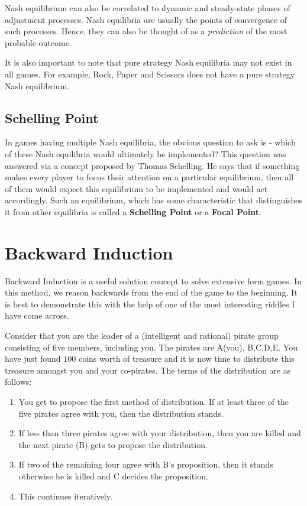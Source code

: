 \documentclass{article}
\theoremstyle{definition}
\begin{document}
Nash equilibrium can also be correlated to dynamic and steady-state phases of adjustment processes. Nash equilibria are usually the points of convergence of such processes. Hence, they can also be thought of as a \textit{prediction} of the most probable outcome. \medskip

It is also important to note that pure strategy Nash equilibria may not exist in all games. For example, Rock, Paper and Scissors does not have a pure strategy Nash equilibrium.

\subsection{Schelling Point}

In games having multiple Nash equilibria, the obvious question to ask is - which of these Nash equilibria would ultimately be implemented? This question was answered via a concept proposed by Thomas Schelling. He says that if something makes every player to focus their attention on a particular equilibrium, then all of them would expect this equilibrium to be implemented and would act accordingly. Such an equilibrium, which has some characteristic that distinguishes it from other equilibria is called a \textbf{Schelling Point} or a \textbf{Focal Point}.

\section{Backward Induction}

Backward Induction is a useful solution concept to solve extensive form games. In this method, we reason backwards from the end of the game to the beginning. It is best to demonstrate this with the help of one of the most interesting riddles I have come across. \medskip

Consider that you are the leader of a (intelligent and rational) pirate group consisting of five members, including you. The pirates are A(you), B,C,D,E. You have just found $100$ coins worth of treasure and it is now time to distribute this treasure amongst you and your co-pirates. The terms of the distribution are as follows:
\begin{enumerate}
    \item You get to propose the first method of distribution. If at least three of the five pirates agree with you, then the distribution stands.
    \item If less than three pirates agree with your distribution, then you are killed and the next pirate (B) gets to propose the distribution. 
    \item If two of the remaining four agree with B's proposition, then it stands otherwise he is killed and C decides the proposition.
    \item This continues iteratively.
\end{enumerate}
\end{document}
